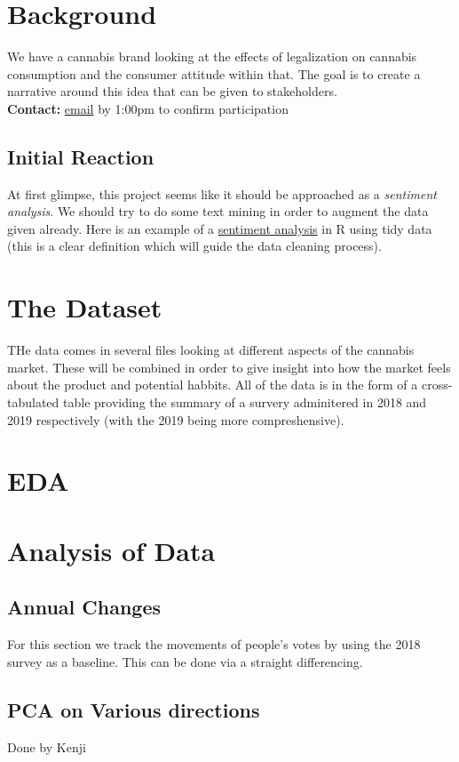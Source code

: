 \documentclass[12pt,a4paper]{book}
\begin{document}
\section{Background}
We have a cannabis brand looking at the effects of legalization on cannabis consumption and the consumer attitude within that. The goal is to create a narrative around this idea that can be given to stakeholders. \\
\textbf{Contact:} \href{mailto: }{email} by 1:00pm to confirm participation 

\subsection{Initial Reaction}
At first glimpse, this project seems like it should be approached as a \textit{sentiment analysis}. We should try to do some text mining in order to augment the data given already. Here is an example of a \href{https://www.tidytextmining.com/sentiment.html}{sentiment analysis} in R using tidy data (this is a clear definition which will guide the data cleaning process).


\section{The Dataset}
THe data comes in several files looking at different aspects of the cannabis market. These will be combined in order to give insight into how the market feels about the product and potential habbits. All of the data is in the form of a cross-tabulated table providing the summary of a survery adminitered in 2018 and 2019 respectively (with the 2019 being more compreshensive). 

\section{EDA}

\section{Analysis of Data}

\subsection{Annual Changes}
For this section we track the movements of people's votes by using the 2018 survey as a baseline. This can be done via a straight differencing.

\subsection{PCA on Various directions}
Done by Kenji 
\end{document}

